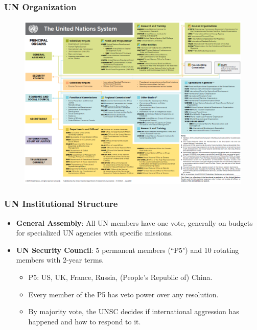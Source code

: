 \documentclass{beamer}
\begin{document}
\begin{frame} 
	\frametitle{\LARGE{UN Organization}}
	\begin{figure}[ht!]
		\centering
		\includegraphics[width=\textwidth,height=\textheight,keepaspectratio]{UNorg.png}
	\end{figure}
\end{frame}	

\begin{frame} 
	\frametitle{\LARGE{UN Institutional Structure}}
	\begin{itemize}
		\item \textbf{General Assembly}: All UN members have one vote, generally on budgets for specialized UN agencies with specific missions.
		\item \textbf{UN Security Council}: 5 permanent members (``P5") and 10 rotating members with 2-year terms.
		\begin{itemize}
			\item P5: US, UK, France, Russia, (People's Republic of) China. \pause
			\item Every member of the P5 has veto power over any resolution. \pause
			\item By majority vote, the UNSC decides if international aggression has happened and how to respond to it. 			
		\end{itemize}
	\end{itemize}
\end{frame}
\end{document}
